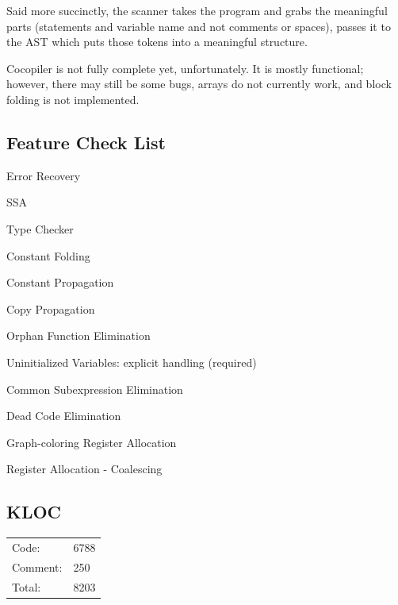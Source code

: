 \documentclass{tamureport}
\newcommand{\cmark}{\ding{51}}%
\newcommand{\xmark}{\ding{55}}%
\begin{document}
Said more succinctly, the scanner takes the program and grabs the meaningful parts (statements and variable name and not comments or spaces), passes it to the AST which puts those tokens into a meaningful structure. 

Cocopiler is not fully complete yet, unfortunately. It is mostly functional; however, there may still be some bugs, arrays do not currently work, and block folding is not implemented. 

\subsection*{Feature Check List}
\begin{todolist}
    \item Error Recovery
    \item[\xmark] SSA
    \item[\cmark] Type Checker
    \item[\cmark] Constant Folding
    \item[\cmark] Constant Propagation
    \item[\cmark] Copy Propagation 
    \item[\cmark] Orphan Function Elimination
    \item[\cmark] Uninitialized Variables: explicit handling (required)
    \item[\cmark] Common Subexpression Elimination
    \item[\cmark] Dead Code Elimination
    \item[\cmark] Graph-coloring Register Allocation
    \item[\xmark] Register Allocation - Coalescing
\end{todolist}

\vspace{2em}
{
\subsection*{KLOC}
\large
\begin{tabular}{p{3.5cm}l}
    Code: & 6788\\
    Comment: & 250\\
    Total: & 8203 
\end{tabular}
}

\vspace{2em}

% 










\end{document}
